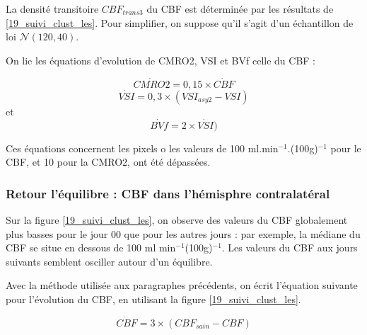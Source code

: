 \begin{enumerate}[label=\textbf{(L\'esion 2 - \arabic*)}]
La densit\'e transitoire $CBF_{trans3}$ du CBF est d\'etermin\'ee par les r\'esultats de \ref{19_suivi_clust_les}. %
Pour simplifier, on suppose qu'il s'agit d'un \'echantillon de loi $\mathcal{N}(120,40)$.

\par
On lie les \'equations d'evolution de CMRO2, VSI et BVf  celle du CBF :

\begin{equation}
\dot{CMRO2}=0,15\times\dot{CBF}
\end{equation}
\begin{equation}
\dot{VSI}=0,3\times (VSI_{asy2}-VSI)
\end{equation}
et%
\begin{equation}
\dot{BVf}=2\times\dot{VSI})
\end{equation}

Ces \'equations concernent les pixels o les valeurs de 100 ml.min${}^{-1}$.(100g)${}^{-1}$ pour le CBF, %
et 10 pour la CMRO2, ont \'et\'e d\'epass\'ees.
\end{enumerate}



\subsubsection{Retour  l'\'equilibre : CBF dans l'h\'emisphre contralat\'eral}

Sur la figure \ref{19_suivi_clust_les}, on observe des valeurs du CBF globalement plus basses pour le jour 00 que pour les autres jours : %
par exemple, la m\'ediane du CBF se situe en dessous de 100 ml min${}^{-1}$(100g)${}^{-1}$. %
Les valeurs du CBF aux jours suivants semblent osciller autour d'un \'equilibre.

\par
Avec la m\'ethode utilis\'ee aux paragraphes pr\'ec\'edents, on \'ecrit l'\'equation suivante pour l'\'evolution du CBF, %
en utilisant la figure \ref{19_suivi_clust_les}.

\begin{equation}
\dot{CBF}=3\times (CBF_{sain}-CBF)
\end{equation}






